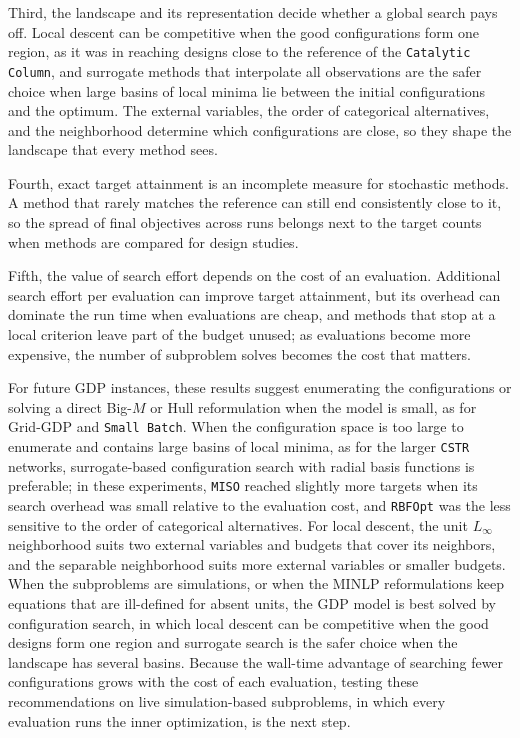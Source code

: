 \documentclass{article}
\begin{document}
Third, the landscape and its representation decide whether a global search pays off.
Local descent can be competitive when the good configurations form one region, as it was in reaching designs close to the reference of the \texttt{Catalytic Column}, and surrogate methods that interpolate all observations are the safer choice when large basins of local minima lie between the initial configurations and the optimum.
The external variables, the order of categorical alternatives, and the neighborhood determine which configurations are close, so they shape the landscape that every method sees.

Fourth, exact target attainment is an incomplete measure for stochastic methods.
A method that rarely matches the reference can still end consistently close to it, so the spread of final objectives across runs belongs next to the target counts when methods are compared for design studies.

Fifth, the value of search effort depends on the cost of an evaluation.
Additional search effort per evaluation can improve target attainment, but its overhead can dominate the run time when evaluations are cheap, and methods that stop at a local criterion leave part of the budget unused; as evaluations become more expensive, the number of subproblem solves becomes the cost that matters.

For future GDP instances, these results suggest enumerating the configurations or solving a direct Big-\(M\) or Hull reformulation when the model is small, as for Grid-GDP and \texttt{Small Batch}.
When the configuration space is too large to enumerate and contains large basins of local minima, as for the larger \texttt{CSTR} networks, surrogate-based configuration search with radial basis functions is preferable; in these experiments, \texttt{MISO} reached slightly more targets when its search overhead was small relative to the evaluation cost, and \texttt{RBFOpt} was the less sensitive to the order of categorical alternatives.
For local descent, the unit \(L_\infty\) neighborhood suits two external variables and budgets that cover its neighbors, and the separable neighborhood suits more external variables or smaller budgets.
When the subproblems are simulations, or when the MINLP reformulations keep equations that are ill-defined for absent units, the GDP model is best solved by configuration search, in which local descent can be competitive when the good designs form one region and surrogate search is the safer choice when the landscape has several basins.
Because the wall-time advantage of searching fewer configurations grows with the cost of each evaluation, testing these recommendations on live simulation-based subproblems, in which every evaluation runs the inner optimization, is the next step.
\end{document}
